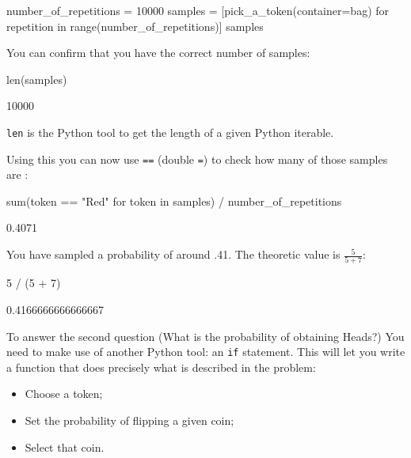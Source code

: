 \begin{pyin}
number_of_repetitions = 10000
samples = [pick_a_token(container=bag) for repetition in range(number_of_repetitions)]
samples
\end{pyin}





\begin{pyin}
\end{pyin}

You can confirm that you have the correct number of samples:

\begin{pyin}
len(samples)
\end{pyin}

\begin{raw}
10000
\end{raw}

\begin{note}
\texttt{len} is the Python tool to get the length of a given Python iterable.
\end{note}



Using this you can now use \texttt{==} (double \texttt{=}) to check how many of those 
samples are :

\begin{pyin}
sum(token == "Red" for token in samples) / number_of_repetitions
\end{pyin}

\begin{raw}
0.4071
\end{raw}

You have sampled a probability of around .41. The theoretic value is \(\frac{5}{5 +
7}\):


\begin{pyin}
5 / (5 + 7)
\end{pyin}





\begin{raw}
0.4166666666666667
\end{raw}






To answer the second question (What is the probability of obtaining Heads?) You
need to make use of another Python tool: an \texttt{if} statement. This will let
you
write a function that does precisely what is described in the problem:
\begin{itemize}
\item 

Choose a token;

\item 

Set the probability of flipping a given coin;

\item 

Select that coin.

\end{itemize}



